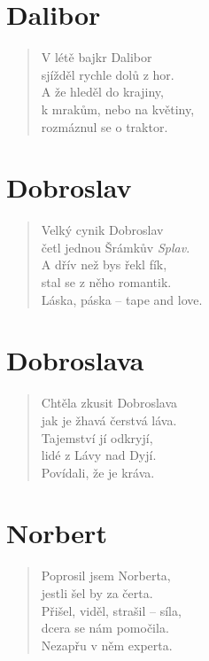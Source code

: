 \section*{Dalibor}
\begin{verse}
V létě bajkr Dalibor\\
sjížděl rychle dolů z hor.\\
A že hleděl do krajiny,\\
k mrakům, nebo na květiny,\\
rozmáznul se o traktor.
\end{verse}

\section*{Dobroslav}
\begin{verse}
Velký cynik Dobroslav\\
četl jednou Šrámkův \textit{Splav}.\\
A dřív než bys řekl fík,\\
stal se z něho romantik.\\
Láska, páska -- tape and love.	
\end{verse}


\section*{Dobroslava}
\begin{verse}
Chtěla zkusit Dobroslava\\
jak je žhavá čerstvá láva.\\
Tajemství jí odkryjí,\\
lidé z Lávy nad Dyjí.\\
Povídali, že je kráva.	
\end{verse}

\section*{Norbert}
\begin{verse}
Poprosil jsem Norberta,\\
jestli šel by za čerta.\\
Přišel, viděl, strašil -- síla,\\
dcera se nám pomočila.\\
Nezapřu v něm experta.	
\end{verse}

